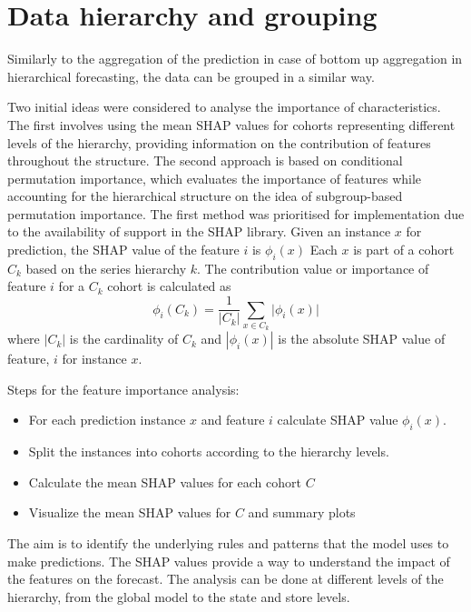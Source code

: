 

\section{Data hierarchy and grouping}
\label{sec:data_hierarchy_grouping}


Similarly to the aggregation of the prediction in case of bottom up aggregation in hierarchical forecasting, the data can be grouped in a similar way.



Two initial ideas were considered to analyse the importance of characteristics.
The first involves using the mean SHAP values for cohorts representing different levels of the hierarchy, providing information on the contribution of features throughout the structure.
The second approach is based on conditional permutation importance, which evaluates the importance of features while
accounting for the hierarchical structure on the idea of subgroup-based permutation importance\cite{cond_pfi}.
The first method was prioritised for implementation due to the availability of support in the SHAP library\cite{scott_lundberg_consistent_2018}.
Given an instance $x$ for prediction, the SHAP value of the feature $i$ is $\phi_i(x)$
Each $x$ is part of a cohort $C_k$ based on the series hierarchy $k$.
The contribution value or importance of feature $i$ for a $C_{k}$ cohort is calculated as
\begin{equation}
    \phi_i(C_k) = \frac{1}{|C_k|} \sum_{x \in C_k} |{\phi_i(x)|}
\end{equation}
where $|C_k|$ is the cardinality of $C_k$ and $|{\phi_i(x)}|$ is the absolute SHAP value of feature, $i$ for instance $x$.

Steps for the feature importance analysis:
\begin{itemize}
    \item For each prediction instance $x$ and feature \(i\) calculate SHAP value $\phi_i(x)$.
    \item Split the instances into cohorts according to the hierarchy levels.
    \item Calculate the mean SHAP values for each cohort $C$
    \item Visualize the mean SHAP values for $C$ and summary plots
\end{itemize}

The aim is to identify the underlying rules and patterns that the model uses to make predictions.
The SHAP values provide a way to understand the impact of the features on the forecast.
The analysis can be done at different levels of the hierarchy, from the global model to the state and store levels.





